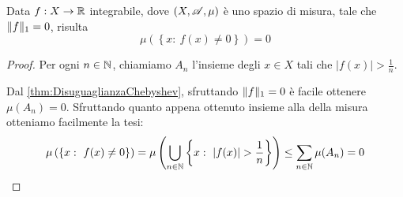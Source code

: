 \begin{corollary}\label{cor:L1NullaAlloraNulla}
	Data $f:X\to\mathbb R$ integrabile, dove $(X,\mathscr A,\mu)$ è uno spazio di misura, tale che $\Vert f\Vert_1=0$, risulta
	\begin{equation*}
		\mu\left(\left\{x:\ f(x)\not=0\right\}\right)=0
	\end{equation*}
\end{corollary}
\begin{proof}
	Per ogni $n\in\mathbb N$, chiamiamo $A_n$ l'insieme degli $x\in X$ tali che $|f(x)|>\frac 1n$.
	
	Dal \cref{thm:DisuguaglianzaChebyshev}, sfruttando $\Vert f\Vert_1=0$ è facile ottenere $\mu(A_n)=0$. 
	Sfruttando quanto appena ottenuto insieme alla \sigsubadd[ità] della misura otteniamo facilmente la tesi:
	\begin{equation*}
		\mu\left(\left\{x:\ f(x)\not=0\right\}\right)=\mu\left(\bigcup_{n\in\N}\left\{x:\ |f(x)|>\frac1n\right\}\right)\le\sum_{n\in\N}\mu(A_n)=0
	\end{equation*}
\end{proof}









